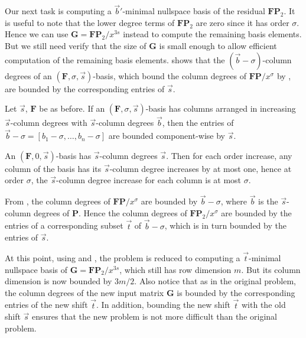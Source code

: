 Our next task is computing a $\vec{b}'$-minimal nullspace basis of
the residual $\mathbf{F}\mathbf{P}_{2}$. It is useful to note that
the lower degree terms of $\mathbf{F}\mathbf{P}_{2}$ are zero since
it has order $\sigma$. Hence we can use $\mathbf{G}=\mathbf{F}\mathbf{P}_{2}/x^{3s}$
instead to compute the remaining basis elements. But we still need
verify that the size of $\mathbf{G}$ is small enough to allow efficient
computation of the remaining basis elements. 
shows that the $\left(\vec{b}-\sigma\right)$-column degrees of an
$(\mathbf{F},\sigma,\vec{s})$-basis, which bound the column degrees
of $\mathbf{F}\mathbf{P}/x^{\sigma}$ by ,
are bounded by the corresponding entries of $\vec{s}$.
\begin{lem}
\label{lem:boundOnShiftedDegrees}Let $\vec{s}$, $\mathbf{F}$ be
as before. If an $(\mathbf{F},\sigma,\vec{s})$-basis has columns
arranged in increasing $\vec{s}$-column degrees with $\vec{s}$-column
degrees $\vec{b}$, then the entries of $\vec{b}-\sigma=\left[b_{1}-\sigma,\dots,b_{n}-\sigma\right]$
are bounded component-wise by $\vec{s}$.\end{lem}
\begin{pf}
An $(\mathbf{F},0,\vec{s})$-basis has $\vec{s}$-column degrees $\vec{s}$.
Then for each order increase, any column of the basis has its $\vec{s}$-column
degree increases by at most one, hence at order $\sigma$, the $\vec{s}$-column
degree increase for each column is at most $\sigma$.
\end{pf}
From , the column degrees of $\mathbf{F}\mathbf{P}/x^{\sigma}$
are bounded by $\vec{b}-\sigma$, where $\vec{b}$ is the $\vec{s}$-column
degrees of $\mathbf{P}$. Hence the column degrees of $\mathbf{F}\mathbf{P}_{2}/x^{\sigma}$
are bounded by the entries of a corresponding subset $\vec{t}$ of
$\vec{b}-\sigma$, which is in turn bounded by the entries of $\vec{s}$. 

At this point, using 
and , the problem is reduced
to computing a $\vec{t}$-minimal nullspace basis of $\mathbf{G}=\mathbf{F}\mathbf{P}_{2}/x^{3s}$,
which still has row dimension $m$. But its column dimension is now
bounded by $3m/2$. Also notice that as in the original problem, the
column degrees of the new input matrix $\mathbf{G}$ is bounded by
the corresponding entries of the new shift $\vec{t}$. In addition,
bounding the new shift $\vec{t}$ with the old shift $\vec{s}$ ensures
that the new problem is not more difficult than the original problem. 

